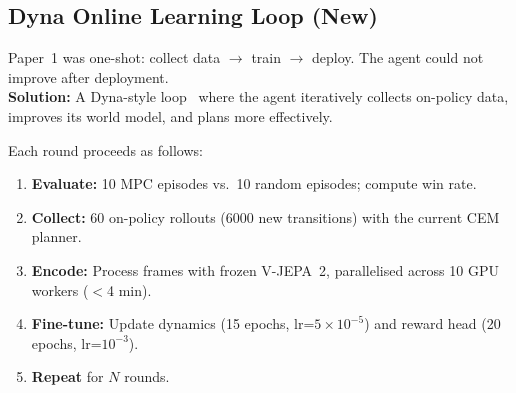 \documentclass{article}
\begin{document}
\subsection{Dyna Online Learning Loop \textnormal{\small(New)}}

\begin{breakthroughbox}
\small Paper~1 was one-shot: collect data $\rightarrow$ train $\rightarrow$ deploy. The agent could not improve after deployment.\\[2pt]
\textbf{Solution:} A Dyna-style loop~\citep{sutton1991dyna} where the agent iteratively collects on-policy data, improves its world model, and plans more effectively.
\end{breakthroughbox}

\noindent Each round proceeds as follows:
\begin{enumerate}
    \item \textbf{Evaluate:} 10 MPC episodes vs.\ 10 random episodes; compute win rate.
    \item \textbf{Collect:} 60 on-policy rollouts (6000 new transitions) with the current CEM planner.
    \item \textbf{Encode:} Process frames with frozen V-JEPA~2, parallelised across 10 GPU workers ($<$4 min).
    \item \textbf{Fine-tune:} Update dynamics (15 epochs, lr=$5{\times}10^{-5}$) and reward head (20 epochs, lr=$10^{-3}$).
    \item \textbf{Repeat} for $N$ rounds.
\end{enumerate}
\end{document}
